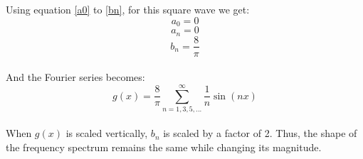 \documentclass{article}
\begin{document}
Using equation \ref{a0} to \ref{bn}, for this square wave we get:
    \begin{equation}
    a_0 = 0
    \end{equation}
    \begin{equation}
    a_n = 0
    \end{equation}
    \begin{equation}
    b_n = \frac{8}{\pi}
    \end{equation}\\
And the Fourier series becomes:
    \begin{equation}
g(x) = \frac{8}{\pi} \sum_{n=1,3,5,...}^{\infty} \frac{1}{n} \sin\left(nx\right)
    \end{equation}\\
When $g(x)$ is scaled vertically, $b_n$ is scaled by a factor of 2. Thus, the shape of the frequency spectrum remains the same while changing its magnitude.  
\end{document}
